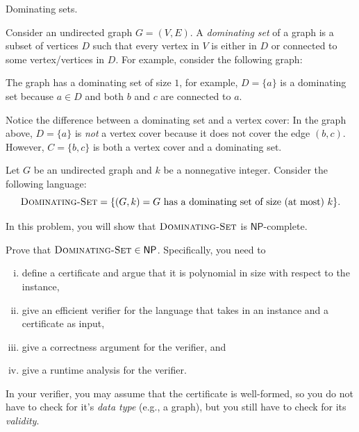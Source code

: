 \documentclass[12pt, letterpaper]{article}
\newcommand{\NP}{\mathsf{NP}}
\begin{document}
\begin{problem}{Dominating sets.}
    

    Consider an undirected graph $G = (V,E)$. A \emph{dominating set} of a graph is a subset of vertices $D$ such that every vertex in $V$ is either in $D$ or connected to some vertex/vertices in $D$. For example, consider the following graph:

    \begin{center}
    \end{center}

    The graph has a dominating set of size $1$, for example, $D = \{a \}$ is a dominating set because $a \in D$ and both $b$ and $c$ are connected to $a$. 

    Notice the difference between a dominating set and a vertex cover: In the graph above, $D = \{a \}$ is \emph{not} a vertex cover because it does not cover the edge $(b,c)$. However, $C = \{b,c\}$ is both a vertex cover and a dominating set. 

    Let $G$ be an undirected graph and $k$ be a nonnegative integer. Consider the following language:
    \[
        \textsc{Dominating-Set} = \{(G,k) = \text{$G$ has a dominating set of size (at most) $k$}\}.
    \]

    In this problem, you will show that $\textsc{Dominating-Set}$ is $\NP$-complete.
\end{problem}
\begin{subproblem}{}
    Prove that $\DomSet \in \NP$. Specifically, you need to 
              \begin{enumerate}[(i)]
                \item define a certificate and argue that it is polynomial in size with respect to the instance,
                  \item give an efficient verifier for the language that takes in an instance and a certificate as input, 
                  \item give a correctness argument for the verifier, and
                  \item give a runtime analysis for the verifier.
              \end{enumerate}
              In your verifier, you may assume that the certificate is well-formed, so you do not have to check for it's \emph{data type} (e.g., a graph), but you still have to check for its \emph{validity}.\label{dom-set-np}
\end{subproblem}
\end{document}
